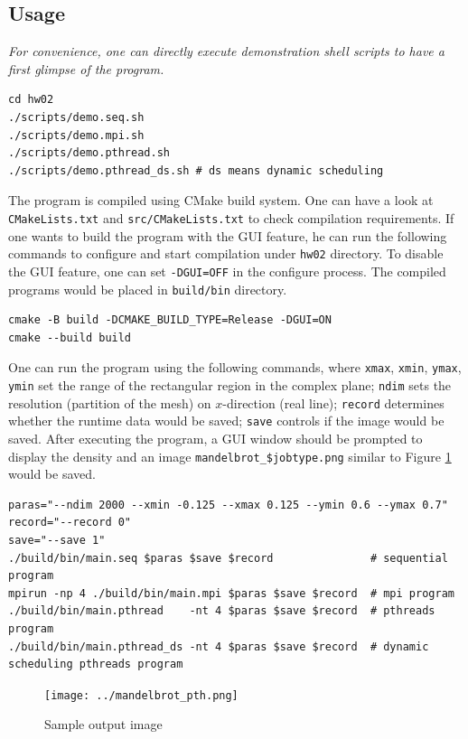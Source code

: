 \documentclass[twoside,12pt]{article}
\theoremstyle{definition}
\theoremstyle{remark}
\begin{document}
\subsection{Usage}
\textit{\color{red}
For convenience, one can directly execute 
demonstration shell scripts to have a first glimpse of the program.
}
\begin{lstlisting}[style=sh]
cd hw02
./scripts/demo.seq.sh
./scripts/demo.mpi.sh
./scripts/demo.pthread.sh
./scripts/demo.pthread_ds.sh # ds means dynamic scheduling
\end{lstlisting}

The program is compiled using CMake build system.
One can have a look at \lstinline|CMakeLists.txt| and \lstinline|src/CMakeLists.txt| 
to check compilation requirements.
If one wants to build the program with the GUI feature, he can run the following commands to
configure and start compilation under \lstinline|hw02| directory.
To disable the GUI feature, one can set \lstinline|-DGUI=OFF| in the configure process.
The compiled programs would be placed in \lstinline|build/bin| directory.
\begin{lstlisting}[style=sh]
cmake -B build -DCMAKE_BUILD_TYPE=Release -DGUI=ON
cmake --build build
\end{lstlisting}

One can run the program using the following commands,
where \lstinline|xmax|, \lstinline|xmin|, \lstinline|ymax|, \lstinline|ymin|
set the range of the rectangular region in the complex plane;
\lstinline|ndim| sets the resolution (partition of the mesh) on
$x$-direction (real line);
\lstinline|record| determines whether the runtime data would be saved;
\lstinline|save| controls if the image would be saved.
After executing the program,
a GUI window should be prompted to display the density
and an image \lstinline|mandelbrot_$jobtype.png| similar to 
Figure \ref{fig:image} would be saved.
\begin{lstlisting}[style=sh]
paras="--ndim 2000 --xmin -0.125 --xmax 0.125 --ymin 0.6 --ymax 0.7"
record="--record 0"
save="--save 1"
./build/bin/main.seq $paras $save $record               # sequential program
mpirun -np 4 ./build/bin/main.mpi $paras $save $record  # mpi program   
./build/bin/main.pthread    -nt 4 $paras $save $record  # pthreads program
./build/bin/main.pthread_ds -nt 4 $paras $save $record  # dynamic scheduling pthreads program 
\end{lstlisting}
\begin{figure}[h!]
    \centering
    \texttt{[image: ../mandelbrot\_pth.png]}
    \caption{Sample output image}
    \label{fig:image}
\end{figure}
\end{document}
